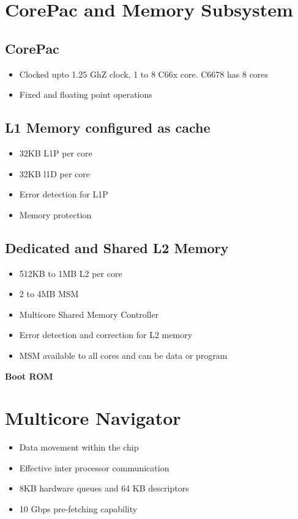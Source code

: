 \documentclass{article}
\begin{document}
\section{CorePac and Memory Subsystem}
\subsection{CorePac}
\begin{itemize}
\item Clocked upto 1.25 GhZ clock, 1 to 8  C66x core. C6678 has 8 cores
\item Fixed and floating point operations
\end{itemize}
\subsection{L1 Memory configured as cache}
\begin{itemize}
\item 32KB  L1P per core
\item 32KB l1D per core
\item Error detection for L1P
\item Memory protection
\end{itemize}
\subsection{Dedicated and Shared L2 Memory}
\begin{itemize}
\item 512KB to 1MB L2 per core
\item 2 to 4MB MSM
\item Multicore Shared Memory Controller
\item Error detection and correction for L2 memory
\item MSM available to all cores and can be data or program
\end{itemize}
\textbf{Boot ROM}
\section{Multicore Navigator}
\begin{itemize}
\item Data movement within the chip
\item Effective inter processor communication
\item 8KB hardware queues and 64 KB descriptors
\item 10 Gbps pre-fetching capability
\end{itemize}
\end{document}
